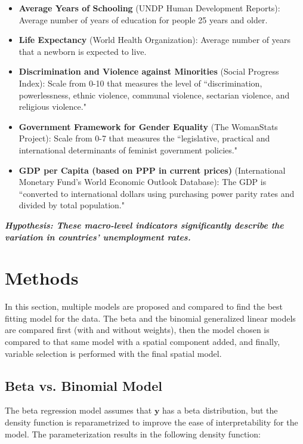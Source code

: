 \documentclass[letterpaper,11pt]{article}
\begin{document}
\begin{itemize}
\item \textbf{Average Years of Schooling} (UNDP Human Development Reports): Average number of years of education for people 25 years and older.
\item \textbf{Life Expectancy} (World Health Organization): Average number of years that a newborn is expected to live.
\item \textbf{Discrimination and Violence against Minorities} (Social Progress Index): Scale from 0-10 that measures the level of ``discrimination, powerlessness, ethnic violence, communal violence, sectarian violence, and religious violence."
\item \textbf{Government Framework for Gender Equality} (The WomanStats Project): Scale from 0-7 that measures the  ``legislative, practical and international determinants of feminist government policies."
\item \textbf{GDP per Capita (based on PPP in current prices)} (International Monetary Fund’s World Economic Outlook Database): The GDP is ``converted to international dollars using purchasing power parity rates and divided by total population."
\end{itemize}

\normalsize

\textbf{\emph{Hypothesis: These macro-level indicators significantly describe the variation in countries' unemployment rates.}}

\section{Methods}

In this section, multiple models are proposed and compared to find the best fitting model for the data. The beta and the binomial generalized linear models are compared first (with and without weights), then the model chosen is compared to that same model with a spatial component added, and finally, variable selection is performed with the final spatial model.  

\subsection{Beta vs. Binomial Model}

The beta regression model assumes that $\mathbf{y}$ has a beta distribution, but the density function is reparametrized to improve the ease of interpretability for the model. The parameterization results in the following density function:
\end{document}
